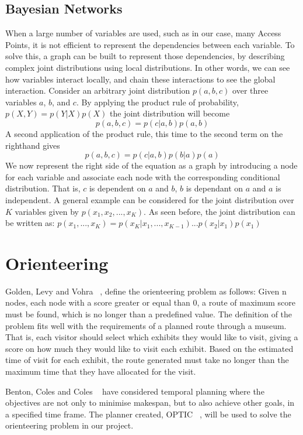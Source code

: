 \subsection{Bayesian Networks}
When a large number of variables are used, such as in our case, many Access Points, it is not efficient to represent the dependencies between each variable. To solve this, a graph can be built to represent those dependencies, by describing complex joint distributions using local distributions. In other words, we can see how variables interact locally, and chain these interactions to see the global interaction.
Consider an arbitrary joint distribution $p(a,b,c)$ over three variables $a$, $b$, and $c$.
By applying the product rule of probability, $p(X,Y) = p(Y|X)p(X)$ the joint distribution will become $$p(a,b,c) = p(c|a,b)p(a,b)$$
A second application of the product rule, this time to the second term on the righthand gives $$p(a,b,c) = p(c|a, b)p(b|a)p(a)$$
We now represent the right side of the equation as a graph by introducing a node for each variable and associate each node with the corresponding conditional distribution. That is, $c$ is dependent on $a$ and $b$, $b$ is dependant on $a$ and $a$ is independent. A general example can be considered for the joint distribution over $K$ variables given by $p(x_1,x_2,...,x_K)$. As seen before, the joint distribution can be written as: $p(x_1,...,x_K) = p(x_K|x_1,...,x_{K-1})...p(x_2|x_1)p(x_1)$

\section{Orienteering}
Golden, Levy and Vohra ~\cite{Golden}, define the orienteering problem as follows: Given n nodes, each node with a score greater or equal than 0, a route of maximum score must be found, which is no longer than a predefined value. The definition of the problem fits well with the requirements of a planned route through a museum. That is, each visitor should select which exhibits they would like to visit, giving a score on how much they would like to visit each exhibit. Based on the estimated time of visit for each exhibit, the route generated must take no longer than the maximum time that they have allocated for the visit.

Benton, Coles and Coles ~\cite{Coles} have considered temporal planning where the objectives are not only to minimise makespan, but to also achieve other goals, in a specified time frame. The planner created, OPTIC ~\cite{OPTIC}, will be used to solve the orienteering problem in our project.








